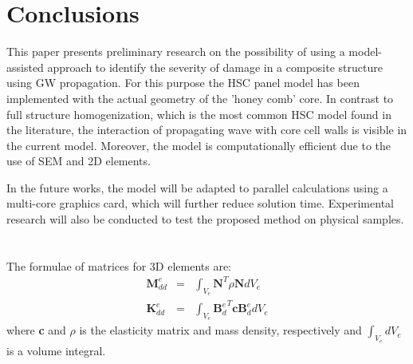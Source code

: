 \documentclass[materials,article,submit,moreauthors,pdftex]{Definitions/mdpi}
\begin{document}
{\section{Conclusions}
\label{sec:conc}
This paper presents preliminary research on the possibility of using a model-assisted approach to identify the severity of damage in a composite structure using GW propagation.
For this purpose the HSC panel model has been implemented with the actual geometry of the 'honey comb' core.
In contrast to  full structure homogenization, which is the most common HSC model found in the literature, the interaction of propagating wave with core cell walls is visible in the current model.
Moreover, the model is computationally efficient due to the use of SEM and 2D elements.

In the future works, the model will be adapted to parallel calculations using a multi-core graphics card, which will further reduce solution time. Experimental research will also be conducted to test the proposed method on physical samples.


\appendix
\section{}
\label{app:matrices}
The formulae of matrices for 3D elements are:
\begin{eqnarray}
\textbf{M}_{dd}^e & = & \int_{V_e}\textbf{N}^T\rho \textbf{N} dV_e\\
\textbf{K}_{dd}^e & = & \int_{V_e}{\textbf{B}_d^e}^T\textbf{c}\textbf{B}_d^edV_e
\end{eqnarray}
where \textbf{c} and \(\rho\) is the elasticity matrix and mass density, respectively and \(\int_{V_e}dV_e\) is a volume integral.

}
\end{document}
